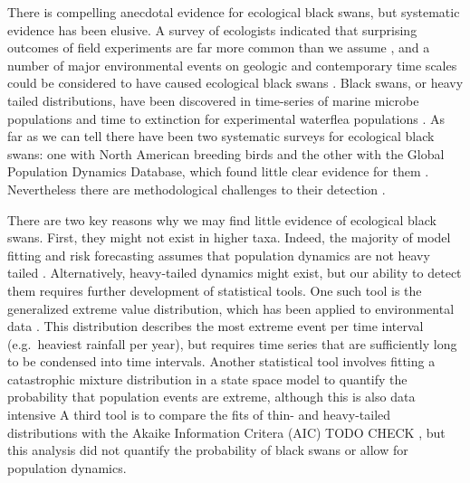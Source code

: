 There is compelling anecdotal evidence for ecological black swans, but systematic evidence has been elusive. A survey of ecologists indicated that surprising outcomes of field experiments are far more common than we assume \citep{doak2008}, and a number of major environmental events on geologic and contemporary time scales could be considered to have caused ecological black swans \citep{nunez2012}. Black swans, or heavy tailed distributions, have been discovered in time-series of marine microbe populations \citet{segura2013} and time to extinction for experimental waterflea populations \citet{drake2014}. As far as we can tell there have been two systematic surveys for ecological black swans: one with North American breeding birds and the other with the Global Population Dynamics Database, which found little clear evidence for them \citep{keitt1998,allen2001,halley2002}. Nevertheless there are methodological challenges to their detection \citep{allen2001,ward2007}.

There are two key reasons why we may find little evidence of ecological black swans. First, they might not exist in higher taxa. Indeed, the majority of model fitting and risk forecasting assumes that population dynamics are not heavy tailed \citep[e.g.][]{brook2006a,dennis2006,knape2012}. Alternatively, heavy-tailed dynamics might exist, but our ability to detect them requires further development of statistical tools. One such tool is the generalized extreme value distribution, which has been applied to environmental data \citep[e.g.][]{katz2005}. This distribution describes the most extreme event per time interval (e.g.~heaviest rainfall per year), but requires time series that are sufficiently long to be condensed into time intervals. Another statistical tool involves fitting a catastrophic mixture distribution in a state space model to quantify the probability that population events are extreme, although this is also data intensive \citep{ward2007} A third tool is to compare the fits of thin- and heavy-tailed distributions with the Akaike Information Critera (AIC) TODO CHECK \citep{halley2002}, but this analysis did not quantify the probability of black swans or allow for population dynamics.

